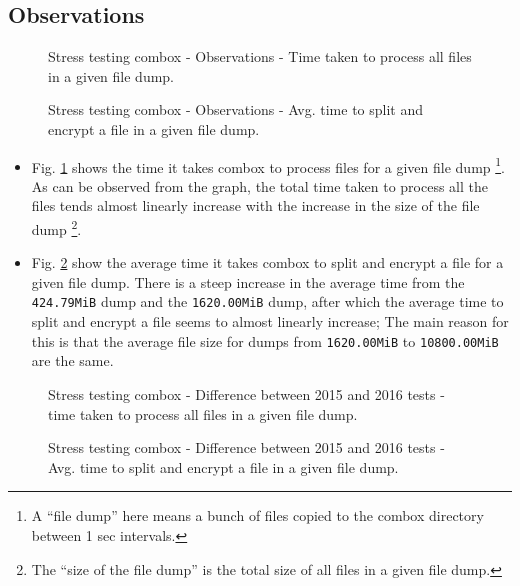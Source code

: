 \subsection{Observations}\label{4-st-o}

\begin{figure}[h]
  \centering 
  \caption{Stress testing combox - Observations - Time taken to
    process all files in a given file dump.}
  \label{fig:4-st-tt}
\end{figure}

\begin{figure}[h]
  \centering 
  \caption{Stress testing combox - Observations - Avg. time to split
    and encrypt a file in a given file dump.}
  \label{fig:4-st-atsae}
\end{figure}


\begin{itemize}
\item Fig. \ref{fig:4-st-tt} shows the time it takes combox to process
  files for a given file dump \footnote{A ``file dump'' here means a
    bunch of files copied to the combox directory between 1 sec
    intervals.}. As can be observed from the graph, the total time
  taken to process all the files tends almost linearly increase with
  the increase in the size of the file dump \footnote{The ``size of
    the file dump'' is the total size of all files in a given file
    dump.}.
\item Fig. \ref{fig:4-st-atsae} show the average time it takes combox
  to split and encrypt a file for a given file dump. There is a steep
  increase in the average time from the \verb+424.79MiB+ dump and the
  \verb+1620.00MiB+ dump, after which the average time to split and
  encrypt a file seems to almost linearly increase; The main reason
  for this is that the average file size for dumps from
  \verb+1620.00MiB+ to \verb+10800.00MiB+ are the same.
\end{itemize}

\begin{figure}[h]
  \centering 
  \caption{Stress testing combox - Difference between 2015 and 2016
    tests - time taken to process all files in a given file dump.}
  \label{fig:4-st-tt-diff}
\end{figure}

\begin{figure}[h]
  \centering 
  \caption{Stress testing combox - Difference between 2015 and 2016
    tests - Avg. time to split and encrypt a file in a given file
    dump.}
  \label{fig:4-st-atsae-diff}
\end{figure}

